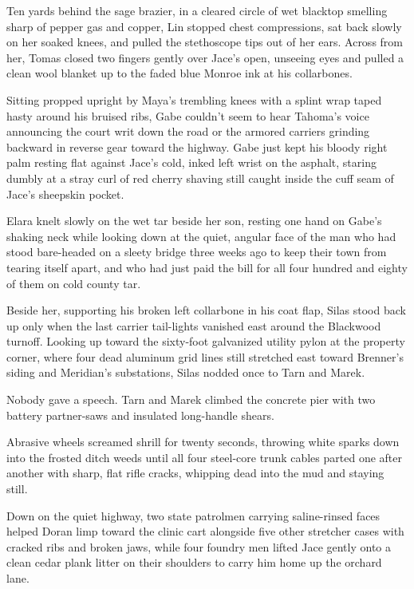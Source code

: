 Ten yards behind the sage brazier, in a cleared circle of wet blacktop smelling sharp of pepper gas and copper, Lin stopped chest compressions, sat back slowly on her soaked knees, and pulled the stethoscope tips out of her ears. Across from her, Tomas closed two fingers gently over Jace's open, unseeing eyes and pulled a clean wool blanket up to the faded blue Monroe ink at his collarbones.

Sitting propped upright by Maya's trembling knees with a splint wrap taped hasty around his bruised ribs, Gabe couldn't seem to hear Tahoma's voice announcing the court writ down the road or the armored carriers grinding backward in reverse gear toward the highway. Gabe just kept his bloody right palm resting flat against Jace's cold, inked left wrist on the asphalt, staring dumbly at a stray curl of red cherry shaving still caught inside the cuff seam of Jace's sheepskin pocket.

Elara knelt slowly on the wet tar beside her son, resting one hand on Gabe's shaking neck while looking down at the quiet, angular face of the man who had stood bare-headed on a sleety bridge three weeks ago to keep their town from tearing itself apart, and who had just paid the bill for all four hundred and eighty of them on cold county tar.

Beside her, supporting his broken left collarbone in his coat flap, Silas stood back up only when the last carrier tail-lights vanished east around the Blackwood turnoff. Looking up toward the sixty-foot galvanized utility pylon at the property corner, where four dead aluminum grid lines still stretched east toward Brenner's siding and Meridian's substations, Silas nodded once to Tarn and Marek.

Nobody gave a speech. Tarn and Marek climbed the concrete pier with two battery partner-saws and insulated long-handle shears.

Abrasive wheels screamed shrill for twenty seconds, throwing white sparks down into the frosted ditch weeds until all four steel-core trunk cables parted one after another with sharp, flat rifle cracks, whipping dead into the mud and staying still.

Down on the quiet highway, two state patrolmen carrying saline-rinsed faces helped Doran limp toward the clinic cart alongside five other stretcher cases with cracked ribs and broken jaws, while four foundry men lifted Jace gently onto a clean cedar plank litter on their shoulders to carry him home up the orchard lane.
